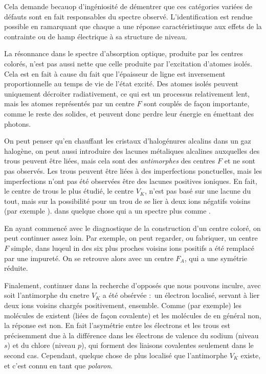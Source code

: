 Cela demande becauop d'ingéniosité de démentrer que ces catégories variées de défauts sont en fait responsables du spectre observé. L'identification est rendue possible en ramarquant que chaque a une réponse caractéristiuque aux effets de la contrainte ou de hamp électrique à sa structure de niveau.

La résonnance dans le spectre d'absorption optique, produite par les centres colorés, n'est pas aussi nette que celle produite par l'excitation d'atomes isolés. Cela est en fait à cause du fait que l'épaisseur de ligne est inversement proportionnelle au temps de vie de l'état excité. Des atomes isolés peuvent uniquement décroiter radiativement, ce qui est un processus relativement lent, mais les atomes représentés par un centre $F$ sont couplés de façon importante, comme le reste des solides, et peuvent donc perdre leur énergie en émettant des photons.

On peut penser qu'en chauffant les cristaux d'halogénures alcalins dans un gaz halogène, on peut aussi introduire des lacunes métaliques alcalines auxquelles des trous peuvent être liées, mais cela sont des \emph{antimorphes} des centres $F$ et ne sont pas observés. Les trous peuvent être liées à des imperfections ponctuelles, mais les imperfections n'ont pas été observées être des lacunes positives ioniques. En fait, le centre de trous le plus étudié, le centre $V_K$, n'est pas basé sur une lacune du tout, mais sur la possibilité pour un trou de se lier à deux ions négatifs voisins (par exemple ). dans quelque chose qui a un spectre plus comme .

En ayant commencé avec le diagnostique de la construction d'un centre coloré, on peut continuer assez loin. Par exemple, on peut regarder, ou fabriquer, un centre $F$ simple, dans luqeul in des six plus proches voisins ions positifs a été remplacé par une impureté. On se retrouve alors avec un centre $F_A$, qui a une symétrie réduite.

Finalement, continuer dans la recherche d'opposés que nous pouvons inculre, avec soit l'antimorphe du cnetre $V_K$ a été obsérvée : un électron localisé, servant à lier deux ions voisins chargés positivement, ensemble. Comme (par exemple) les molécules de  existent (liées de façon covalente) et les molécules de  en général non, la réponse est non. En fait l'asymétrie entre les électrons et les trous est précisemment due à la différence dans les électrons de valence du sodium (niveau $s$) et du chlore (niveau $p$), qui forment des liaisons covalentes seulement dans le second cas. Cependant, quelque chose de plus localisé que l'antimorphe $V_K$ existe, et c'est connu en tant que \emph{polaron}.

